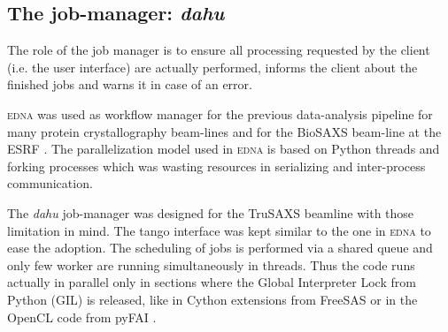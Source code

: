 \documentclass[preprint]{iucr}              %
\begin{document}
\subsection{The job-manager: \textit{dahu}}

The role of the job manager is to ensure all processing requested by the client (i.e. the user interface) are actually performed, informs the client about the finished jobs and warns it in case of an error.

\textsc{edna} was used as workflow manager for the previous data-analysis pipeline for many protein crystallography beam-lines \cite{edna} and for the BioSAXS beam-line at the ESRF \cite{BM29ODA}.
The parallelization model used in \textsc{edna} is based on Python threads and forking processes which was wasting resources in serializing and inter-process communication. 
 
The \textit{dahu} job-manager was designed for the TruSAXS beamline \cite{id02_2022} with those limitation in mind. 
The tango interface \cite{tango} was kept similar to the one in \textsc{edna} to ease the adoption.
The scheduling of jobs is performed via a shared queue and only few worker are running simultaneously in threads.
Thus the code runs actually in parallel only in sections where the Global Interpreter Lock from Python (GIL) is released, like in Cython extensions \cite{cython} from FreeSAS or in the OpenCL code from pyFAI \cite{pyFAI_gpu}.
\end{document}
